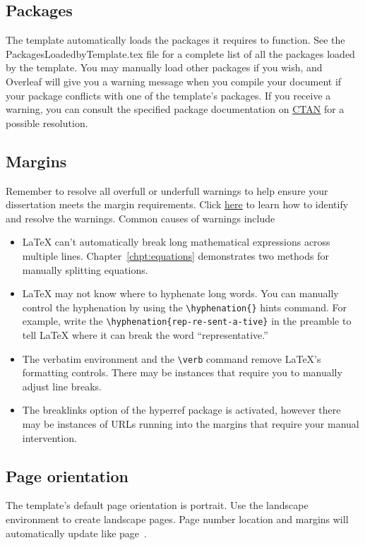 \subsection{Packages}
The template automatically loads the packages it requires to function. See the PackagesLoadedbyTemplate.tex file for a complete list of all the packages loaded by the template. You may manually load other packages if you wish, and Overleaf will give you a warning message when you compile your document if your package conflicts with one of the template's packages. If you receive a warning, you can consult the specified package documentation on \underline{\href{https://www.ctan.org}{CTAN}} for a possible resolution.

\subsection{Margins}
Remember to resolve all overfull or underfull warnings to help ensure your dissertation meets the margin requirements. Click \underline{\href{https://www.overleaf.com/learn/how-to/Understanding_underfull_and_overfull_box_warnings\#How_the_Error_Happens}{here}} to learn how to identify and resolve the warnings. Common causes of warnings include 
\begin{itemize}
\item LaTeX can't automatically break long mathematical expressions across multiple lines. Chapter~\ref{chpt:equations} demonstrates two methods for manually splitting equations.
\item LaTeX may not know where to hyphenate long words. You can manually control the hyphenation by using the \verb|\hyphenation{}| hints command. For example, write the \verb|\hyphenation{rep-re-sent-a-tive}| in the preamble to tell LaTeX where it can break the word ``representative.''
\item The verbatim environment and the \verb|\verb| command remove LaTeX's formatting controls. There may be instances that require you to manually adjust line breaks.
\item The breaklinks option of the hyperref package is activated, however there may be instances of URLs running into the margins that require your manual intervention.
\end{itemize}

\subsection{Page orientation}
The template's default page orientation is portrait. Use the landscape environment to create landscape pages. Page number location and margins will automatically update like page~\pageref{fig:landlemur1}.

